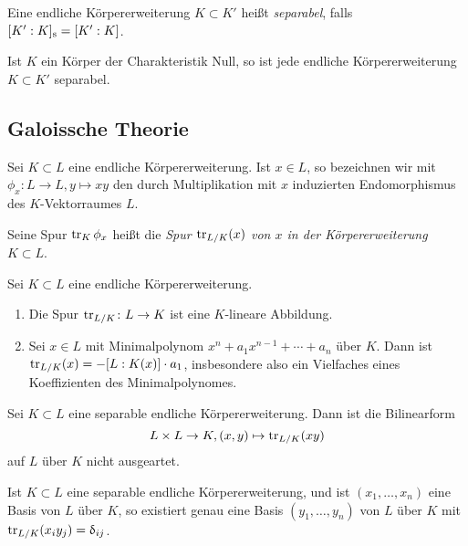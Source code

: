 \begin{definition}
	Eine endliche Körpererweiterung \(K \subset K'\) heißt \emph{separabel}, falls
	\([K' : K]_{\mathrm{s}} = [K' : K]\).
\end{definition}

\begin{proposition}
	Ist \(K\) ein Körper der Charakteristik Null, so ist jede endliche Körpererweiterung \(K \subset K'\)
	separabel.
\end{proposition}

\subsection{Galoissche Theorie}

\begin{definition}
	Sei \(K \subset L\) eine endliche Körpererweiterung. Ist \(x \in L\), so bezeichnen wir
	mit \(\phi_x\colon L \to L, y \mapsto x y\) den durch Multiplikation mit \(x\) induzierten
	Endomorphismus des \(K\)-Vektorraumes \(L\).
	
	Seine Spur \(\operatorname{tr}_K \phi_x\) heißt die \emph{Spur \(\operatorname{tr}_{L/K}(x)\) von \(x\) in der Körpererweiterung
	\(K \subset L\)}.
\end{definition}

\begin{proposition}
	Sei \(K \subset L\) eine endliche Körpererweiterung.
	\begin{enumerate}
	\item
		Die Spur \(\operatorname{tr}_{L/K}\colon L \to K\) ist eine \(K\)-lineare Abbildung.
	\item
		Sei \(x \in L\) mit Minimalpolynom \(x^n + a_1 x^{n - 1} + \dotsb + a_n\) über \(K\).
		Dann ist \(\operatorname{tr}_{L/K} (x) = - [L : K(x)] \cdot a_1\), insbesondere also ein Vielfaches eines
		Koeffizienten des Minimalpolynomes.
	\end{enumerate}
\end{proposition}

\begin{theorem}
	Sei \(K \subset L\) eine separable endliche Körpererweiterung. Dann ist die Bilinearform
	\[
		L \times L \to K, (x, y) \mapsto \operatorname{tr}_{L/K} (xy)
	\]
	auf \(L\) über \(K\) nicht ausgeartet.
\end{theorem}

\begin{corollary}
	Ist \(K \subset L\) eine separable endliche Körpererweiterung, und ist
	\((x_1, \dotsc, x_n)\) eine Basis von \(L\) über \(K\), so existiert genau eine Basis
	\((y_1, \dotsc, y_n)\) von \(L\) über \(K\) mit \(\operatorname{tr}_{L/K} (x_i y_j) = \updelta_{ij}\).
\end{corollary}


